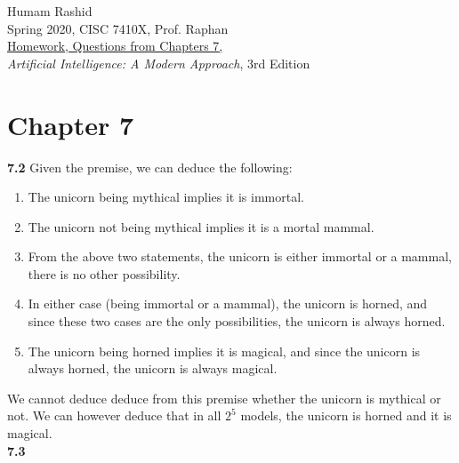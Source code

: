 \documentclass{scrartcl}
\begin{document}
\begin{flushleft}
Humam Rashid\\
Spring 2020, CISC 7410X, Prof. Raphan\\
\underline{Homework, Questions from Chapters 7,}\\
\textit{Artificial Intelligence: A Modern Approach}, 3rd Edition
\end{flushleft}

\section*{Chapter 7}
\textbf{7.2} Given the premise, we can deduce the following:
\begin{enumerate}
    \item The unicorn being mythical implies it is immortal.
    \item The unicorn not being mythical implies it is a mortal mammal.
    \item From the above two statements, the unicorn is either immortal or a mammal, there is no
        other possibility.
    \item In either case (being immortal or a mammal), the unicorn is horned, and since these two
        cases are the only possibilities, the unicorn is always horned.
    \item The unicorn being horned implies it is magical, and since the unicorn is always horned,
        the unicorn is always magical.
\end{enumerate}
We cannot deduce deduce from this premise whether the unicorn is mythical or not. We can however
deduce that in all $2^5$ models, the unicorn is horned and it is magical.
\bigskip
\\
\textbf{7.3}
\end{document}
